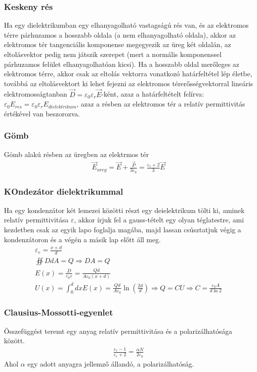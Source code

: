 \documentclass{article}
\begin{document}
\subsubsection{Keskeny rés}
Ha egy dielektrikumban egy elhanyagolható vastagságú rés van, és az elektromos térre párhuzamos a hosszabb oldala (a nem elhanyagolható oldala), akkor az elektromos tér tangenciális komponense megegyezik az üreg két oldalán, az eltolásvektor pedig nem játszik szerepet (mert a normális komponenssel párhuzamos felület elhanyagolhatóan kicsi). Ha a hosszabb oldal merőleges az elektromos térre, akkor csak az eltolás vektorra vonatkozó határfeltétel lép életbe, továbbá az eltolásvektort ki lehet fejezni az elektromos térerősségvektorral lineáris elektromosságtanban $\vec{D} = \varepsilon_0 \varepsilon_r \vec{E}$-ként, azaz a határfeltételt felírva: $\varepsilon_0 E_{res} = \varepsilon_0 \varepsilon_r E_{dielektrikum}$, azaz a résben az elektromos tér a relatív permittivitás értékével van beszorozva.
\subsubsection{Gömb}
Gömb alakú résben az üregben az elektrmos tér
\begin{gather*}
\vec{E}_{ureg}=\vec{E}+\frac{\vec{P}}{3\varepsilon_0} = \frac{\varepsilon_r+2}{3}\vec{E}
\end{gather*}
\subsubsection{KOndezátor dielektrikummal}
Ha egy kondenzátor két lemezei közötti részt egy deielektrikum tölti ki, aminek relatív permittivitása $\varepsilon$, akkor írjuk fel a gauss-tételt egy olyan téglatestre, ami kezdetben csak az egyik lapo foglalja magába, majd lassan csúsztatjuk végig a kondenzátoron és a végén a másik lap előtt áll meg.
\begin{gather*}
\varepsilon_r = \frac{x+d}{d} \\
\oiint DdA = Q \Rightarrow DA=Q \\
E(x) = \frac{D}{\varepsilon_0 \varepsilon} = \frac{Qd}{A\varepsilon_0(x+d)} \\
U(x) = \int_{0}^d dx E(x) = \frac{Qd}{A\varepsilon_0}\ln(\frac{2d}{d}) \Rightarrow Q=CU \Rightarrow C=\frac{\varepsilon_0 A}{d\ln 2}
\end{gather*}
\subsubsection{Clausius-Mossotti-egyenlet}
Összefüggést teremt egy anyag relatív permittivitása és a polarizálhatósága között.
\begin{gather*}
\frac{\varepsilon_r-1}{\varepsilon_r+2} = \frac{\alpha N}{2\varepsilon_0}
\end{gather*}
Ahol $\alpha$ egy adott anyagra jellemző állandó, a polarizálhatóság.
\newpage
\end{document}
